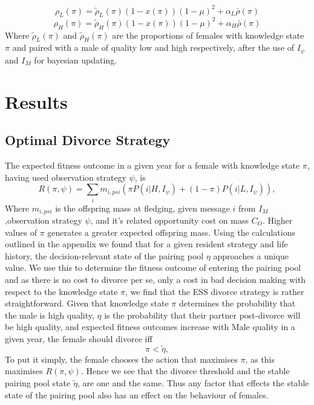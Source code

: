 \documentclass[10pt]{article}
\begin{document}
\begin{equation}
	\rho_{L}(\pi)=\tilde{\rho}_{L}(\pi)(1-x(\pi))(1-\mu)^{2}+\alpha_{L}\bar{\rho}(\pi)\label{eq:14}
\end{equation}
\begin{equation}
	\rho_{H}(\pi)=\tilde{\rho}_{H}(\pi)(1-x(\pi))(1-\mu)^{2}+\alpha_{H}\bar{\rho}(\pi)\label{eq:15}
\end{equation}
Where $\tilde{\rho}_{L}(\pi)$ and $\tilde{\rho}_{H}(\pi)$ are the proportions of females with knowledge state $\pi$ and paired with a male of quality low and high respectively, after the use of $I_\psi$ and $I_M$ for bayesian updating. 

\section{Results}
\subsection{Optimal Divorce Strategy}
The expected fitness outcome in a given year for a female with knowledge state $\pi$, having used observation strategy $\psi$, is
\begin{equation}
	R(\pi,\psi)=\underset{i}{\sum}m_{i,psi}(\pi P(i|H,I_\psi)+(1-\pi)P(i|L,I_\psi)),\label{eq:16}
\end{equation}
Where $m_{i,psi}$ is the offspring mass at fledging, given message $i$ from $I_M$,observation strategy $\psi$, and it's related opportunity cost on mass $C_O$. Higher values of $\pi$ generates a greater expected offspring mass. Using the calculations outlined in the appendix we found that for a given resident strategy and life history, the decision-relevant state of the pairing pool $\eta$ approaches a unique value. We use this to determine the fitness outcome of entering the pairing pool and as there is no cost to divorce per se, only a cost in bad decision making with respect to the knowledge state $\pi$, we find that the ESS divorce strategy is rather straightforward. Given that knowledge state $\pi$ determines the probability that the male is high quality, $\eta$ is the probability that their partner post-divorce will be high quality, and expected fitness outcomes increase with Male quality in a given year, the female should divorce iff 
\[
\pi<\tilde{\eta},
\]
To put it simply, the female chooses the action that maximises $\pi$, as this maximises $R(\pi,\psi)$. Hence we see that the divorce threshold and the stable pairing pool state $\tilde{\eta}$, are one and the same. Thus any factor that effects the stable state of the pairing pool also has an effect on the behaviour of females.
\end{document}
